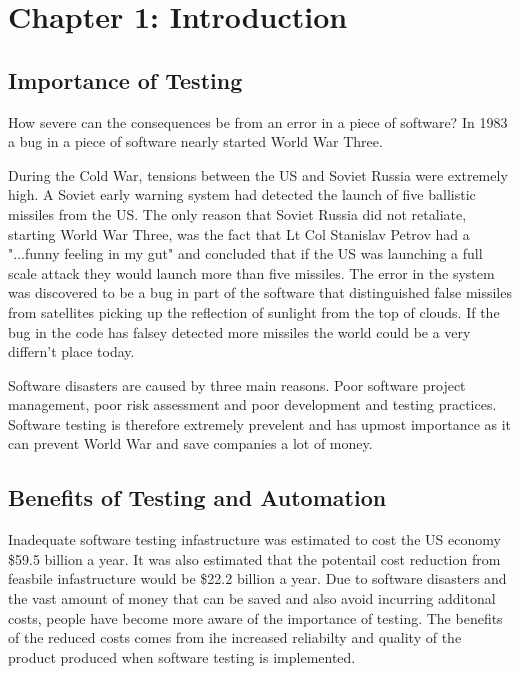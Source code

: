 \documentclass{article}
\begin{document}
\newpage
\tableofcontents

\newpage	
{}
\section{Chapter 1: Introduction}


\subsection{Importance of Testing}

\par How severe can the consequences be from an error in a piece of software? In 1983 a bug in a piece of software nearly started World War Three.
\vspace{5mm}
\par During the Cold War, tensions between the US and Soviet Russia were extremely high. A Soviet early warning system had detected the launch of five ballistic missiles from the US. The only reason that Soviet Russia did not retaliate, starting World War Three, was the fact that Lt Col Stanislav Petrov had a "...funny feeling in my gut"\cite{ZDNetDisasters} and concluded that if the US was launching a full scale attack they would launch more than five missiles. The error in the system was discovered to be a bug in part of the software that distinguished false missiles from satellites picking up the reflection of sunlight from the top of clouds.\cite{ZDNetDisasters} If the bug in the code has falsey detected more missiles the world could be a very differn't place today.
\vspace{5mm}
\par  Software disasters are caused by three main reasons. Poor software project management, poor risk assessment and poor development and testing practices.\cite{mcquaid2012software} Software testing is therefore extremely prevelent and has upmost importance as it can prevent World War and save companies a lot of money.

\subsection{Benefits of Testing and Automation}

\par Inadequate software testing infastructure was estimated to cost the US economy \$59.5 billion a year.\cite{NISTReport} It was also estimated that the potentail cost reduction from feasbile infastructure would be \$22.2 billion a year. \cite{NISTReport} Due to software disasters and the vast amount of money that can be saved and also avoid incurring additonal costs, people have become more aware of the importance of testing. The benefits of the reduced costs  comes from ihe increased reliabilty and quality of the product produced when software testing is implemented.
\end{document}
